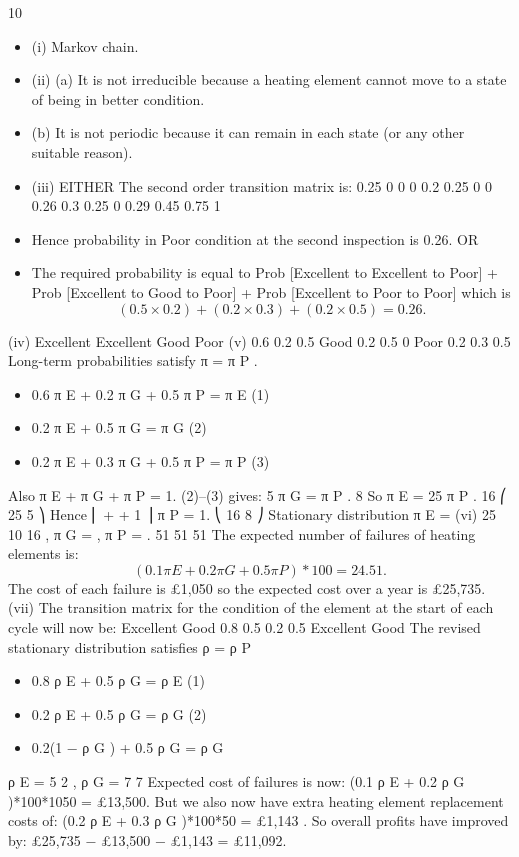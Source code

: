 \documentclass[a4paper,12pt]{article}
\begin{document}
\begin{enumerate}
10
\begin{itemize}
\item (i) Markov chain.
\item (ii) (a)
It is not irreducible
because a heating element cannot move to a state of being in better condition.
\item (b)
It is not periodic
because it can remain in each state (or any other suitable reason).
\item (iii)
EITHER
The second order transition matrix is:
0.25
0
0
0
0.2
0.25
0
0
0.26
0.3
0.25
0
0.29
0.45
0.75
1
\item Hence probability in Poor condition at the second inspection is 0.26.
OR
\item The required probability is equal to
Prob [Excellent to Excellent to Poor] +
Prob [Excellent to Good to Poor] +
Prob [Excellent to Poor to Poor]
which is \[(0.5 × 0.2) + (0.2 × 0.3) + (0.2 × 0.5) = 0.26.\]
\end{itemize}
(iv)
Excellent
Excellent
Good
Poor
(v)
0.6
0.2
0.5
Good
0.2
0.5
0
Poor
0.2
0.3
0.5
Long-term probabilities satisfy π = π P .
\begin{itemize}
\item 0.6 π E + 0.2 π G + 0.5 π P = π E (1)
\item 0.2 π E + 0.5 π G = π G
(2)
\item 0.2 π E + 0.3 π G + 0.5 π P = π P (3)
\end{itemize}
Also π E + π G + π P = 1.
(2)–(3) gives:
5
π G = π P .
8
So π E =
25
π P .
16
⎛ 25 5 ⎞
Hence ⎜ + + 1 ⎟ π P = 1.
⎝ 16 8 ⎠
Stationary distribution π E =
(vi)
25
10
16
, π G = , π P = .
51
51
51
The expected number of failures of heating elements is:
\[(0.1 π E + 0.2 π G + 0.5 π P )*100 = 24.51.\]
The cost of each failure is £1,050 so the expected cost over a year is £25,735.
(vii)
The transition matrix for the condition of the element at the start of each cycle
will now be:
Excellent Good
0.8
0.5 0.2
0.5
Excellent
Good
The revised stationary distribution satisfies ρ = ρ P
\begin{itemize}
\item 0.8 ρ E + 0.5 ρ G = ρ E (1)
\item 0.2 ρ E + 0.5 ρ G = ρ G (2)
\item 0.2(1 − ρ G ) + 0.5 ρ G = ρ G
\end{itemize}
ρ E =
5
2
, ρ G =
7
7
Expected cost of failures is now:
(0.1 ρ E + 0.2 ρ G )*100*1050 = £13,500.
But we also now have extra heating element replacement costs of:
(0.2 ρ E + 0.3 ρ G )*100*50 = £1,143 .
So overall profits have improved by:
£25,735 − £13,500 − £1,143 = £11,092.


\end{enumerate}
\end{document}
